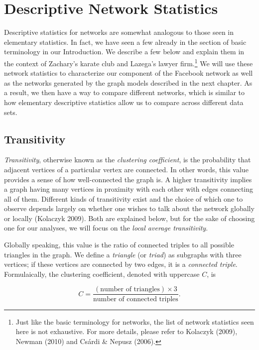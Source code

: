 \documentclass[12pt,twoside]{amherstthesis}
\begin{document}
  \chapter{Descriptive Network
  Statistics}\label{descriptive-network-statistics}
  
  Descriptive statistics for networks are somewhat analogous to those seen
  in elementary statistics. In fact, we have seen a few already in the
  section of basic terminology in our Introduction. We describe a few
  below and explain them in the context of Zachary's karate club and
  Lazega's lawyer firm.\footnote{Just like the basic terminology for
    networks, the list of network statistics seen here is not exhaustive.
    For more details, please refer to Kolaczyk (2009), Newman (2010) and
    Csárdi \& Nepusz (2006).} We will use these network statistics to
  characterize our component of the Facebook network as well as the
  networks generated by the graph models described in the next chapter. As
  a result, we then have a way to compare different networks, which is
  similar to how elementary descriptive statistics allow us to compare
  across different data sets.
  
  \section{Transitivity}\label{transitivity}
  
  \emph{Transitivity}, otherwise known as the \emph{clustering
  coefficient}, is the probability that adjacent vertices of a particular
  vertex are connected. In other words, this value provides a sense of how
  well-connected the graph is. A higher transitivity implies a graph
  having many vertices in proximity with each other with edges connecting
  all of them. Different kinds of transitivity exist and the choice of
  which one to observe depends largely on whether one wishes to talk about
  the network globally or locally (Kolaczyk 2009). Both are explained
  below, but for the sake of choosing one for our analyses, we will focus
  on the \emph{local average transitivity}.
  
  Globally speaking, this value is the ratio of connected triples to all
  possible triangles in the graph. We define a \emph{triangle} (or
  \emph{triad}) as subgraphs with three vertices; if these vertices are
  connected by two edges, it is a \emph{connected triple}. Formulaically,
  the clustering coefficient, denoted with uppercase \(C\), is
  
  \[C = \frac {(\text{number of triangles}) \times 3} {\text{number of connected triples}}.\]
  
\end{document}
